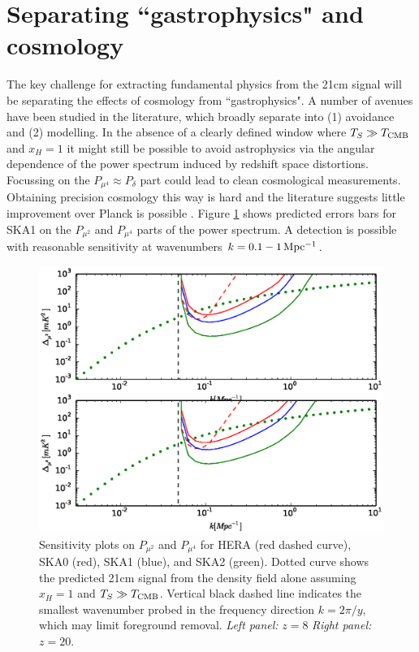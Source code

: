 \documentclass{PoS}
\begin{document}
\section{Separating ``gastrophysics" and cosmology}
\label{sec:separation}

The key challenge for extracting fundamental physics from the 21cm signal will be separating the effects of cosmology from ``gastrophysics". A number of avenues have been studied in the literature, which broadly separate into (1) avoidance and (2) modelling. In the absence of a clearly defined window where $T_S\gg T_{\rm CMB}$ and $x_H=1$ it might still be possible to avoid astrophysics via the angular dependence of the power spectrum induced by redshift space distortions. Focussing on the $P_{\mu^4}\approx P_\delta$ part could lead to clean cosmological measurements. Obtaining precision cosmology this way is hard and the literature suggests little improvement over Planck is possible \cite{2006ApJ...653..815M,2008PhRvD..78b3529M}. Figure \ref{fig:musensitivity} shows predicted errors bars for SKA1 on the $P_{\mu^2}$ and $P_{\mu^4}$ parts of the power spectrum. A detection is possible with reasonable sensitivity at wavenumbers $k=0.1-1{\rm\,Mpc^{-1}}$.

\begin{figure}[htbp]
\begin{center}
\includegraphics[scale=0.35]{figures/musensitivityPlot_z8.eps}
\caption{Sensitivity plots on $P_{\mu^2}$ and $P_{\mu^4}$ for HERA (red dashed curve), SKA0 (red), SKA1 (blue), and SKA2 (green). Dotted curve shows the predicted 21cm signal from the density field alone assuming $x_H=1$ and $T_S\gg T_{\rm CMB}$. Vertical black dashed line indicates the smallest wavenumber probed in the frequency direction $k=2\pi/y$, which may limit foreground removal.  {\em Left panel:} $z=8$ {\em Right panel:} $z=20$.}
\label{fig:musensitivity}
\end{center}
\end{figure}
\end{document}
